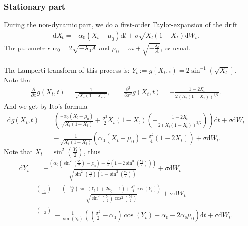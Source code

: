\subsubsection{Stationary part}
During the non-dynamic part, we do a first-order Taylor-expansion of the drift
\begin{align}
    \mathrm{d}X_t = -\alpha_0\left(X_t - \mu_0\right)\mathrm{d}t + \sigma \sqrt{X_t\left(1 - X_t\right)}\mathrm{d}W_t.
\end{align}
The parameters $\alpha_0 = 2\sqrt{-\lambda_0 A}$ and $\mu_0 = m + \sqrt{-\frac{\lambda_0}{A}}$, as usual.\\\\
The Lamperti transform of this process is: $Y_t := g(X_t,t) = 2 \sin^{-1}\left(\sqrt{X_t}\right)$.
Note that
\begin{align}
    \frac{\partial}{\partial x}g(X_t,t) = \frac{1}{\sqrt{X_t\left(1 - X_t\right)}}, \qquad \frac{\partial^2}{\partial x^2}g(X_t,t) = -\frac{1 - 2X_t}{2\left(X_t\left(1 - X_t\right)\right)^{3/2}}.
\end{align}
And we get by Ito's formula
\begin{align}
    \mathrm{d}g(X_t, t) &= \left(\frac{-\alpha_0\left(X_t - \mu_0\right)}{\sqrt{X_t\left(1 - X_t\right)}} + \frac{\sigma^2}{2}X_t\left(1 - X_t\right)\left(-\frac{1 - 2X_t}{2\left(X_t\left(1 - X_t\right)\right)^{3/2}}\right)\right)\mathrm{d}t + \sigma\mathrm{d}W_t \nonumber \\
    &= -\frac{1}{\sqrt{X_t\left(1 - X_t\right)}}\left(\alpha_0\left(X_t - \mu_0\right) + \frac{\sigma^2}{4}\left(1 - 2X_t\right)\right) + \sigma\mathrm{d}W_t.
\end{align}
Note that $X_t = \sin^2\left(\frac{Y_t}{2}\right)$, thus
\begin{align}
    \mathrm{d}Y_t & = -\frac{\left(\alpha_0\left(\sin^2\left(\frac{Y_t}{2}\right) - \mu_0\right) + \frac{\sigma^2}{4}\left(1 - 2\sin^2\left(\frac{Y_t}{2}\right)\right)\right)}{\sqrt{\sin^2\left(\frac{Y_t}{2}\right)\left(1 - \sin^2\left(\frac{Y_t}{2}\right)\right)}} + \sigma\mathrm{d}W_t \nonumber \\
    & \overset{(\dagger_1)}{=} -\frac{\left(-\frac{\alpha_0}{2}\left(\sin\left(Y_t\right) + 2\mu_0 - 1\right) + \frac{\sigma^2}{4}\cos(Y_t)\right)}{\sqrt{\sin^2\left(\frac{Y_t}{2}\right)\cos^2\left(\frac{Y_t}{2}\right)}} + \sigma\mathrm{d}W_t \nonumber \\
    & \overset{(\dagger_2)}{=} -\frac{1}{\sin\left(Y_t\right)}\left(\left(\frac{\sigma^2}{2}-\alpha_0\right)\cos(Y_t) + \alpha_0 - 2\alpha_0\mu_0\right)\mathrm{d}t + \sigma \mathrm{d}W_t. \label{eq:JacobiLampertiSDE}
\end{align}
